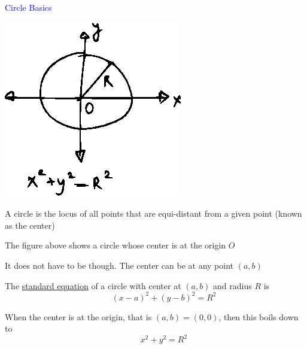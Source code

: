\documentclass[14pt,fleqn]{extarticle}
\begin{document}
 
\begin{skill}
    \begin{narrow}
\textcolor{blue}{Circle Basics} 
 
    \end{narrow}
    
    \reason 
    
    \begin{center}
\includegraphics[scale=1.5]{circle.eps} 
\end{center} 

A circle is the locus of all points that are equi-distant from a given point (known as the center) \newline 

The figure above shows a circle whose center is at the origin $O$\newline 

It does not have to be though. The center can be at any point $(a,b)$\newline 

The \underline{standard equation} of a circle with center at $(a,b)$ and radius $R$   is 
\[ \qquad \left(x-a \right)^2 + \left(y-b \right)^2 = R^2 \]

When the center is at the origin, that is $(a,b) = (0,0)$, then this boils down to 
\[ \qquad x^2 + y^2 = R^2 \]
\end{skill}
\end{document}
